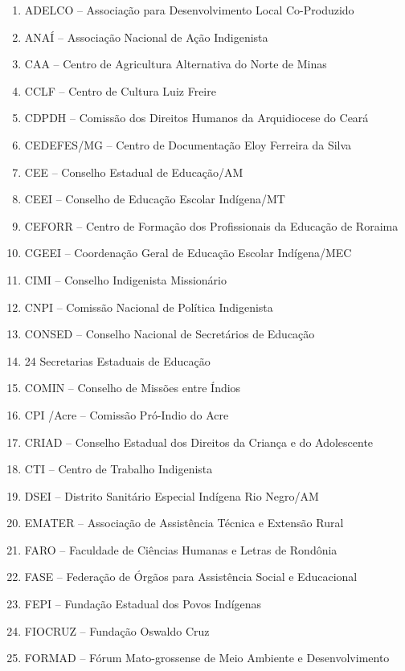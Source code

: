 \documentclass[
]{book}
\begin{document}
\begin{enumerate}
\def\labelenumi{\arabic{enumi}.}
\item
  ADELCO -- Associação para Desenvolvimento Local Co-Produzido
\item
  ANAÍ -- Associação Nacional de Ação Indigenista
\item
  CAA -- Centro de Agricultura Alternativa do Norte de Minas
\item
  CCLF -- Centro de Cultura Luiz Freire
\item
  CDPDH -- Comissão dos Direitos Humanos da Arquidiocese do Ceará
\item
  CEDEFES/MG -- Centro de Documentação Eloy Ferreira da Silva
\item
  CEE -- Conselho Estadual de Educação/AM
\item
  CEEI -- Conselho de Educação Escolar Indígena/MT
\item
  CEFORR -- Centro de Formação dos Profissionais da Educação de Roraima
\item
  CGEEI -- Coordenação Geral de Educação Escolar Indígena/MEC
\item
  CIMI -- Conselho Indigenista Missionário
\item
  CNPI -- Comissão Nacional de Política Indigenista
\item
  CONSED -- Conselho Nacional de Secretários de Educação
\item
  24 Secretarias Estaduais de Educação
\item
  COMIN -- Conselho de Missões entre Índios
\item
  CPI /Acre -- Comissão Pró-Indio do Acre
\item
  CRIAD -- Conselho Estadual dos Direitos da Criança e do Adolescente
\item
  CTI -- Centro de Trabalho Indigenista
\item
  DSEI -- Distrito Sanitário Especial Indígena Rio Negro/AM
\item
  EMATER -- Associação de Assistência Técnica e Extensão Rural
\item
  FARO -- Faculdade de Ciências Humanas e Letras de Rondônia
\item
  FASE -- Federação de Órgãos para Assistência Social e Educacional
\item
  FEPI -- Fundação Estadual dos Povos Indígenas
\item
  FIOCRUZ -- Fundação Oswaldo Cruz
\item
  FORMAD -- Fórum Mato-grossense de Meio Ambiente e Desenvolvimento

\end{enumerate}
\end{document}
